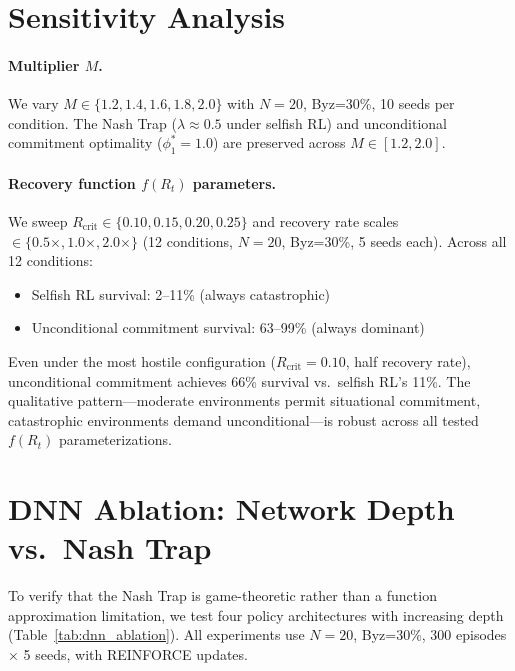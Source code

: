 \documentclass{article}
\begin{document}
\section{Sensitivity Analysis}
\label{app:sensitivity}

\paragraph{Multiplier $M$.}
We vary $M \in \{1.2, 1.4, 1.6, 1.8, 2.0\}$ with $N=20$, Byz=30\%, 10 seeds per condition.
The Nash Trap ($\lambda \approx 0.5$ under selfish RL) and unconditional commitment optimality ($\phi_1^* = 1.0$) are preserved across $M \in [1.2, 2.0]$.

\paragraph{Recovery function $f(R_t)$ parameters.}
We sweep $R_{\text{crit}} \in \{0.10, 0.15, 0.20, 0.25\}$ and recovery rate scales $\in \{0.5\times, 1.0\times, 2.0\times\}$ (12 conditions, $N=20$, Byz=30\%, 5 seeds each).
Across all 12 conditions:
\begin{itemize}
    \item Selfish RL survival: 2--11\% (always catastrophic)
    \item Unconditional commitment survival: 63--99\% (always dominant)
\end{itemize}
Even under the most hostile configuration ($R_{\text{crit}}=0.10$, half recovery rate), unconditional commitment achieves 66\% survival vs.\ selfish RL's 11\%.
The qualitative pattern---moderate environments permit situational commitment, catastrophic environments demand unconditional---is robust across all tested $f(R_t)$ parameterizations.

\section{DNN Ablation: Network Depth vs.\ Nash Trap}
\label{app:dnn_ablation}

To verify that the Nash Trap is game-theoretic rather than a function approximation limitation, we test four policy architectures with increasing depth (Table~\ref{tab:dnn_ablation}).
All experiments use $N{=}20$, Byz=30\%, 300 episodes $\times$ 5 seeds, with REINFORCE updates.
\end{document}
